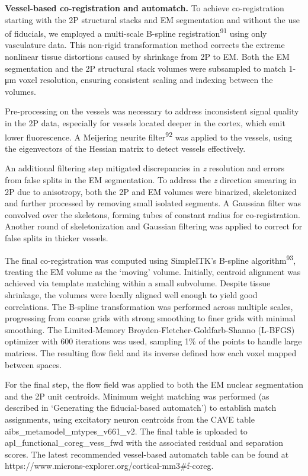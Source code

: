 \documentclass{article}
\begin{document}
\textbf{Vessel-based co-registration and automatch.} To achieve co-registration starting with the 2P structural stacks and EM segmentation and without the use of fiducials, we employed a multi-scale B-spline registration\textsuperscript{91} using only vasculature data. This non-rigid transformation method corrects the extreme nonlinear tissue distortions caused by shrinkage from 2P to EM. Both the EM segmentation and the 2P structural stack volumes were subsampled to match 1-μm voxel resolution, ensuring consistent scaling and indexing between the volumes.

Pre-processing on the vessels was necessary to address inconsistent signal quality in the 2P data, especially for vessels located deeper in the cortex, which emit lower fluorescence. A Meijering neurite filter\textsuperscript{92} was applied to the vessels, using the eigenvectors of the Hessian matrix to detect vessels effectively.

An additional filtering step mitigated discrepancies in \emph{z} resolution and errors from false splits in the EM segmentation. To address the \emph{z} direction smearing in 2P due to anisotropy, both the 2P and EM volumes were binarized, skeletonized and further processed by removing small isolated segments. A Gaussian filter was convolved over the skeletons, forming tubes of constant radius for co-registration. Another round of skeletonization and Gaussian filtering was applied to correct for false splits in thicker vessels.

The final co-registration was computed using SimpleITK’s B-spline algorithm\textsuperscript{93}, treating the EM volume as the ‘moving’ volume. Initially, centroid alignment was achieved via template matching within a small subvolume. Despite tissue shrinkage, the volumes were locally aligned well enough to yield good correlations. The B-spline transformation was performed across multiple scales, progressing from coarse grids with strong smoothing to finer grids with minimal smoothing. The Limited-Memory Broyden-Fletcher-Goldfarb-Shanno (L-BFGS) optimizer with 600 iterations was used, sampling 1\% of the points to handle large matrices. The resulting flow field and its inverse defined how each voxel mapped between spaces.

For the final step, the flow field was applied to both the EM nuclear segmentation and the 2P unit centroids. Minimum weight matching was performed (as described in ‘Generating the fiducial-based automatch’) to establish match assignments, using excitatory neuron centroids from the CAVE table aibs\_metamodel\_mtypes\_v661\_v2. The final table is uploaded to apl\_functional\_coreg\_vess\_fwd with the associated residual and separation scores. The latest recommended vessel-based automatch table can be found at https://www.microns-explorer.org/cortical-mm3\#f-coreg.
\end{document}

